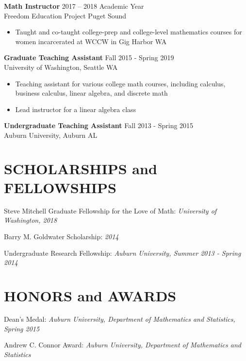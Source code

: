 \documentclass{res}
\begin{document}
\begin{resume}
{\bf Math Instructor} \hfill 2017 -- 2018 Academic Year \\
Freedom Education Project Puget Sound

\begin{itemize}
\item Taught and co-taught college-prep and college-level mathematics courses for women incarcerated at WCCW in Gig Harbor WA
\end{itemize}


{\bf Graduate Teaching Assistant} \hfill Fall 2015 - Spring 2019 \\
University of Washington, Seattle WA

\begin{itemize}
\item Teaching assistant for various college math courses, including calculus, business calculus, linear algebra, and discrete math
\item Lead instructor for a linear algebra class
\end{itemize}


	

	
	
{\bf Undergraduate Teaching Assistant} \hfill Fall 2013 - Spring 2015 \\
Auburn University, Auburn AL

	

	

\section{SCHOLARSHIPS and FELLOWSHIPS}
	\vspace{2mm}
Steve Mitchell Graduate Fellowship for the Love of Math: \textit{University of Washington, 2018}
	
Barry M. Goldwater Scholarship: \textit{2014}

Undergraduate Research Fellowship: \textit{Auburn University, Summer 2013 - Spring 2014}

\section{HONORS and AWARDS}
	\vspace{2mm}

Dean's Medal: \textit{Auburn University, Department of Mathematics and Statistics, Spring 2015}

Andrew C. Connor Award: \textit{Auburn University, Department of Mathematics and Statistics}


\end{resume}
\end{document}
